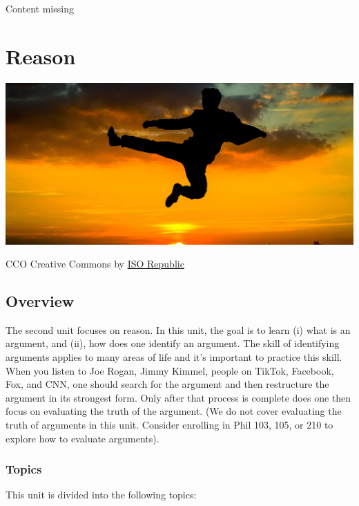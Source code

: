 \documentclass[
]{book}
\begin{document}
{Content missing}

\hypertarget{reason}{%
\chapter{Reason}\label{reason}}

\includegraphics{assets/u2/Unit2Overview.jpg}

CCO Creative Commons by \href{https://isorepublic.com/photo/flying-kick/}{ISO Republic}

\hypertarget{overview-1}{%
\section*{Overview}\label{overview-1}}

The second unit focuses on reason. In this unit, the goal is to learn (i) what is an argument, and (ii), how does one identify an argument. The skill of identifying arguments applies to many areas of life and it's important to practice this skill. When you listen to Joe Rogan, Jimmy Kimmel, people on TikTok, Facebook, Fox, and CNN, one should search for the argument and then restructure the argument in its strongest form. Only after that process is complete does one then focus on evaluating the truth of the argument. (We do not cover evaluating the truth of arguments in this unit. Consider enrolling in Phil 103, 105, or 210 to explore how to evaluate arguments).

\hypertarget{topics-1}{%
\subsection*{Topics}\label{topics-1}}

This unit is divided into the following topics:
\end{document}

